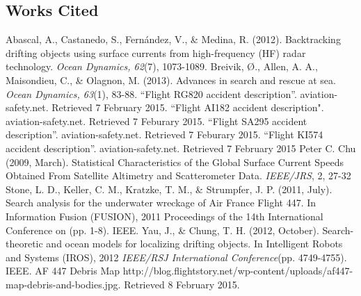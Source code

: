 \documentclass[pre,12pt]{revtex4-1}
\begin{document}
\begin{thebibliography}{10}
\section*{Works Cited}\label{Cited}
Abascal, A., Castanedo, S., Fernández, V., \& Medina, R. (2012). Backtracking drifting objects using surface currents from high-frequency (HF) radar technology. \textit{Ocean Dynamics, 62}(7), 1073-1089.
Breivik, \O., Allen, A. A., Maisondieu, C., \& Olagnon, M. (2013). Advances in search and rescue at sea. \textit{Ocean Dynamics, 63}(1), 83-88.
``Flight RG820 accident description''. aviation-safety.net. Retrieved 7 February 2015.
``Flight AI182 accident description". aviation-safety.net. Retrieved 7 Feburary 2015.
``Flight SA295 accident description''. aviation-safety.net. Retrieved 7 Feburary 2015.
``Flight KI574 accident description''. aviation-safety.net. Retrieved 7 February 2015
Peter C. Chu (2009, March). Statistical Characteristics of the Global Surface Current Speeds Obtained From Satellite Altimetry and Scatterometer Data. \textit{IEEE/JRS}, 2, 27-32
Stone, L. D., Keller, C. M., Kratzke, T. M., \& Strumpfer, J. P. (2011, July). Search analysis for the underwater wreckage of Air France Flight 447. In Information Fusion (FUSION), 2011 Proceedings of the 14th International Conference on (pp. 1-8). IEEE.
Yau, J., \& Chung, T. H. (2012, October). Search-theoretic and ocean models for localizing drifting objects. In Intelligent Robots and Systems (IROS), 2012 \textit{IEEE/RSJ International Conference}(pp. 4749-4755). IEEE.
AF 447 Debris Map http://blog.flightstory.net/wp-content/uploads/af447-map-debris-and-bodies.jpg. Retrieved 8 February 2015.
\end{thebibliography}
\end{document}

